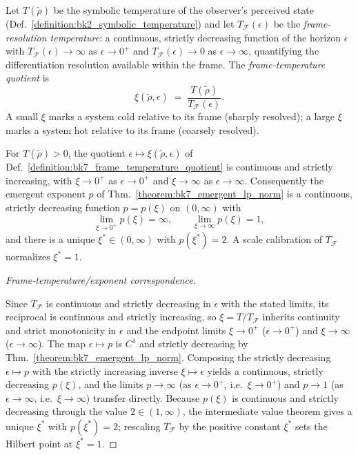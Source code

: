 \begin{definition}
\label{definition:bk7_frame_temperature_quotient}
Let $T(\tilde\rho)$ be the symbolic temperature of the observer's perceived state
(Def.~\ref{definition:bk2_symbolic_temperature}) and let $T_{\mathcal{F}}(\epsilon)$
be the \emph{frame-resolution temperature}: a continuous, strictly decreasing
function of the horizon $\epsilon$ with $T_{\mathcal{F}}(\epsilon)\to\infty$ as
$\epsilon\to 0^{+}$ and $T_{\mathcal{F}}(\epsilon)\to 0$ as $\epsilon\to\infty$,
quantifying the differentiation resolution available within the frame. The
\emph{frame-temperature quotient} is
\[
\xi(\tilde\rho,\epsilon)\;=\;\frac{T(\tilde\rho)}{T_{\mathcal{F}}(\epsilon)}.
\]
A small $\xi$ marks a system cold relative to its frame (sharply resolved); a
large $\xi$ marks a system hot relative to its frame (coarsely resolved).
\end{definition}

\begin{lemma}
\label{lemma:bk7_frame_temperature_exponent_correspondence}
For $T(\tilde\rho)>0$, the quotient $\epsilon\mapsto\xi(\tilde\rho,\epsilon)$ of
Def.~\ref{definition:bk7_frame_temperature_quotient} is continuous and strictly
increasing, with $\xi\to 0^{+}$ as $\epsilon\to 0^{+}$ and $\xi\to\infty$ as
$\epsilon\to\infty$. Consequently the emergent exponent
$p$ of Thm.~\ref{theorem:bk7_emergent_lp_norm} is a continuous, strictly
decreasing function $p=p(\xi)$ on $(0,\infty)$ with
\[
\lim_{\xi\to 0^{+}}p(\xi)=\infty,
\qquad
\lim_{\xi\to\infty}p(\xi)=1,
\]
and there is a unique $\xi^{\ast}\in(0,\infty)$ with $p(\xi^{\ast})=2$. A scale
calibration of $T_{\mathcal{F}}$ normalizes $\xi^{\ast}=1$.
\end{lemma}

\begin{proof}[Frame-temperature/exponent correspondence]
\label{proof:bk7_frame_temperature_exponent_correspondence}
\leavevmode

Since $T_{\mathcal{F}}$ is continuous and strictly decreasing in $\epsilon$ with
the stated limits, its reciprocal is continuous and strictly increasing, so
$\xi=T/T_{\mathcal{F}}$ inherits continuity and strict monotonicity in $\epsilon$
and the endpoint limits $\xi\to 0^{+}$ ($\epsilon\to 0^{+}$) and $\xi\to\infty$
($\epsilon\to\infty$). The map $\epsilon\mapsto p$ is $C^{1}$ and strictly
decreasing by Thm.~\ref{theorem:bk7_emergent_lp_norm}. Composing the strictly
decreasing $\epsilon\mapsto p$ with the strictly increasing inverse
$\xi\mapsto\epsilon$ yields a continuous, strictly decreasing $p(\xi)$, and the
limits $p\to\infty$ (as $\epsilon\to 0^{+}$, i.e.\ $\xi\to 0^{+}$) and $p\to 1$
(as $\epsilon\to\infty$, i.e.\ $\xi\to\infty$) transfer directly. Because $p(\xi)$
is continuous and strictly decreasing through the value $2\in(1,\infty)$, the
intermediate value theorem gives a unique $\xi^{\ast}$ with $p(\xi^{\ast})=2$;
rescaling $T_{\mathcal{F}}$ by the positive constant $\xi^{\ast}$ sets the Hilbert
point at $\xi^{\ast}=1$.
\end{proof}


